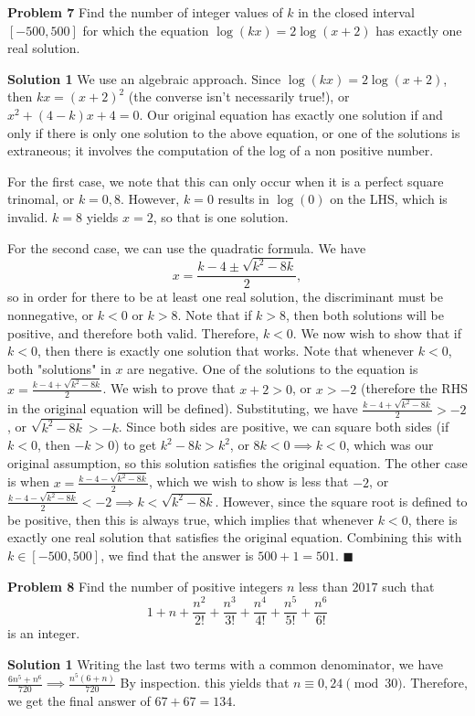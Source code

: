 \documentclass[a4paper,11pt]{article}
\begin{document}
\textbf{Problem 7}
Find the number of integer values of $k$ in the closed interval $[-500,500]$ for which the equation $\log(kx)=2\log(x+2)$ has exactly one real solution.

\textbf{Solution 1}
We use an algebraic approach. Since $\log(kx)=2\log(x+2)$, then $kx = (x+2)^2$ (the converse isn't necessarily true!), or $x^2+(4-k)x+4=0$. Our original equation has exactly one solution if and only if there is only one solution to the above equation, or one of the solutions is extraneous; it involves the computation of the log of a non positive number.

For the first case, we note that this can only occur when it is a perfect square trinomal, or $k = 0, 8$. However, $k = 0$ results in $\log(0)$ on the LHS, which is invalid. $k = 8$ yields $x = 2$, so that is one solution.

For the second case, we can use the quadratic formula. We have \[x = \frac{k-4 \pm \sqrt{k^2-8k}}2,\] so in order for there to be at least one real solution, the discriminant must be nonnegative, or $k < 0$ or $k > 8$. Note that if $k > 8$, then both solutions will be positive, and therefore both valid. Therefore, $k < 0$. We now wish to show that if $k < 0$, then there is exactly one solution that works. Note that whenever $k < 0$, both "solutions" in $x$ are negative. One of the solutions to the equation is $x = \frac{k-4 + \sqrt{k^2-8k}}2$. We wish to prove that $x + 2 > 0$, or $x > -2$ (therefore the RHS in the original equation will be defined). Substituting, we have $\frac{k-4 + \sqrt{k^2-8k}}2 > -2$, or $\sqrt{k^2 - 8k} > -k$. Since both sides are positive, we can square both sides (if $k < 0$, then $-k > 0$) to get $k^2-8k > k^2$, or $8k < 0 \implies k < 0$, which was our original assumption, so this solution satisfies the original equation. The other case is when $x = \frac{k-4 - \sqrt{k^2-8k}}2$, which we wish to show is less that $-2$, or $\frac{k-4 - \sqrt{k^2-8k}}2 < -2 \implies k < \sqrt{k^2-8k}$. However, since the square root is defined to be positive, then this is always true, which implies that whenever $k < 0$, there is exactly one real solution that satisfies the original equation. Combining this with $k \in [-500, 500]$, we find that the answer is $500 + 1 = \boxed{501}$. \hfill $\blacksquare$

\textbf{Problem 8}
Find the number of positive integers $n$ less than $2017$ such that \[1+n+\frac{n^2}{2!}+\frac{n^3}{3!}+\frac{n^4}{4!}+\frac{n^5}{5!}+\frac{n^6}{6!}\] is an integer.

\textbf{Solution 1}
Writing the last two terms with a common denominator, we have $\frac{6n^5+n^6}{720} \implies \frac{n^5(6+n)}{720}$ By inspection. this yields that $n \equiv 0, 24 \pmod{30}$. Therefore, we get the final answer of $67 + 67 = \boxed{134}$.
\end{document}
